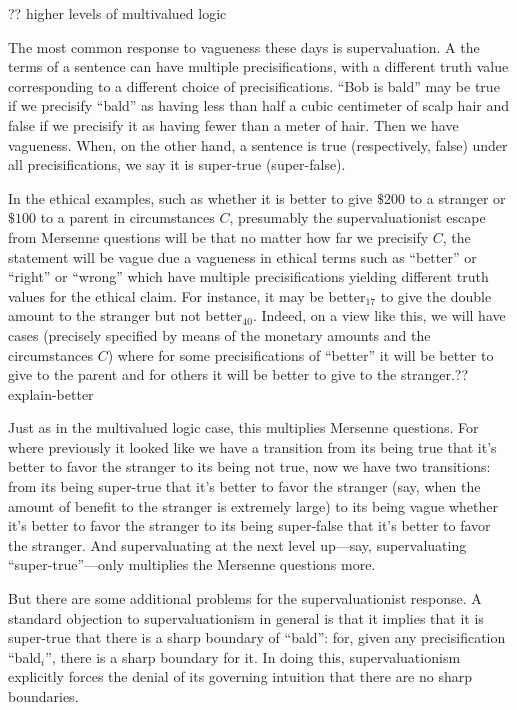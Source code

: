 ?? higher levels of multivalued logic

The most common response to vagueness these days is supervaluation. A the terms of a sentence can have multiple precisifications,
with a different truth value corresponding to a different choice of precisifications. ``Bob is bald'' may be
true if we precisify ``bald'' as having less than half a cubic centimeter of scalp hair and false if we precisify it as
having fewer than a meter of hair. Then we have vagueness. When, on the other hand, a sentence is true (respectively, false) under all precisifications,
we say it is super-true (super-false).

In the ethical examples, such as whether it is better to give $ \$200$ to a stranger or $ \$100$ to a parent in circumstances $C$, presumably the 
supervaluationist escape from Mersenne questions will be that no matter how far we precisify $C$, the statement will be vague due a vagueness in 
ethical terms such as ``better'' or ``right'' or ``wrong'' which have multiple precisifications yielding different truth values for the ethical
claim. For instance, it may be better$_{17}$ to give the double amount to the stranger but not better$_{40}$. Indeed, on a view like this, we will have cases 
(precisely specified by means of the monetary amounts and the circumstances $C$) where for some precisifications of ``better'' it will be better to 
give to the parent and for others it will be better to give to the stranger.??explain-better  

Just as in the multivalued logic case, this multiplies Mersenne questions. For where previously it looked like we have a transition from its being true that it's better
to favor the stranger to its being not true, now we have two transitions: from its being super-true that it's better to favor the stranger (say, when the amount of
benefit to the stranger is extremely large) to its being vague whether it's better to favor the stranger to its being super-false that it's better to favor the stranger.
And supervaluating at the next level up---say, supervaluating ``super-true''---only multiplies the Mersenne questions more.

But there are some additional problems for the supervaluationist response. A standard objection to supervaluationism in general is that it implies that it is
super-true that there is a sharp boundary of ``bald'': for, given any precisification ``bald$_i$'', there is a sharp boundary for it. In doing this, supervaluationism
explicitly forces the denial of its governing intuition that there are no sharp boundaries. 

